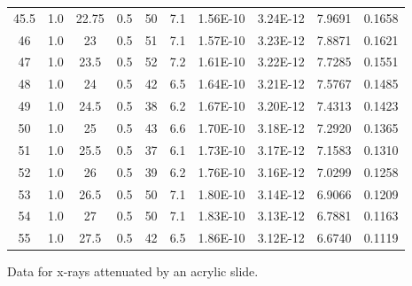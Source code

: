 \begin{maintable}[ht]
\begin{tabular}{cccccccccc}
45.5        & 1.0 & 22.75    & 0.5         & 50    & 7.1      & 1.56E-10      & 3.24E-12         & 7.9691       & 0.1658 \\
46        & 1.0 & 23       & 0.5         & 51    & 7.1      & 1.57E-10      & 3.23E-12         & 7.8871       & 0.1621 \\
47        & 1.0 & 23.5     & 0.5         & 52    & 7.2      & 1.61E-10      & 3.22E-12         & 7.7285       & 0.1551 \\
48        & 1.0 & 24       & 0.5         & 42    & 6.5      & 1.64E-10      & 3.21E-12         & 7.5767       & 0.1485 \\
49        & 1.0 & 24.5     & 0.5         & 38    & 6.2      & 1.67E-10      & 3.20E-12         & 7.4313       & 0.1423 \\
50        & 1.0 & 25       & 0.5         & 43    & 6.6      & 1.70E-10      & 3.18E-12         & 7.2920       & 0.1365 \\
51        & 1.0 & 25.5     & 0.5         & 37    & 6.1      & 1.73E-10      & 3.17E-12         & 7.1583       & 0.1310 \\
52        & 1.0 & 26       & 0.5         & 39    & 6.2      & 1.76E-10      & 3.16E-12         & 7.0299       & 0.1258 \\
53        & 1.0 & 26.5     & 0.5         & 50    & 7.1      & 1.80E-10      & 3.14E-12         & 6.9066       & 0.1209 \\
54        & 1.0 & 27       & 0.5         & 50    & 7.1      & 1.83E-10      & 3.13E-12         & 6.7881       & 0.1163 \\
55        & 1.0 & 27.5     & 0.5         & 42    & 6.5      & 1.86E-10      & 3.12E-12         & 6.6740       & 0.1119 \\

\end{tabular}
\caption{Data for x-rays attenuated by an acrylic slide.}
\label{tab:xrcg4}
\end{maintable}



